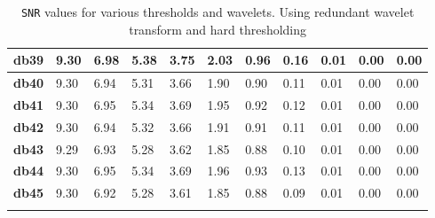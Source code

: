 \begin{tiny}
\begin{longtable}{|l|l|l|l|l|l|l|l|l|l|l|}
\textbf{db39}&9.30&6.98&5.38&3.75&2.03&0.96&0.16&0.01&0.00&0.00\\\hline
\textbf{db40}&9.30&6.94&5.31&3.66&1.90&0.90&0.11&0.01&0.00&0.00\\\hline
\textbf{db41}&9.30&6.95&5.34&3.69&1.95&0.92&0.12&0.01&0.00&0.00\\\hline
\textbf{db42}&9.30&6.94&5.32&3.66&1.91&0.91&0.11&0.01&0.00&0.00\\\hline
\textbf{db43}&9.29&6.93&5.28&3.62&1.85&0.88&0.10&0.01&0.00&0.00\\\hline
\textbf{db44}&9.30&6.95&5.34&3.69&1.96&0.93&0.13&0.01&0.00&0.00\\\hline
\textbf{db45}&9.30&6.92&5.28&3.61&1.85&0.88&0.09&0.01&0.00&0.00\\\hline
\caption{\texttt{SNR} values for various thresholds and wavelets. Using redundant wavelet transform and hard thresholding}
\label{tab:SNRRedHard}
\end{longtable}
\end{tiny}